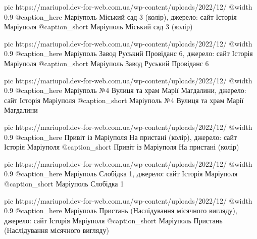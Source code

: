   pic https://mariupol.dev-for-web.com.ua/wp-content/uploads/2022/12/%
  @width 0.9
  @caption_here Маріуполь Міський сад 3 (колір), джерело: сайт Історія Маріуполя
  @caption_short Маріуполь Міський сад 3 (колір)

  pic https://mariupol.dev-for-web.com.ua/wp-content/uploads/2022/12/%
  @width 0.9
  @caption_here Маріуполь Завод Руський Провіданс 6, джерело: сайт Історія Маріуполя
  @caption_short Маріуполь Завод Руський Провіданс 6

  pic https://mariupol.dev-for-web.com.ua/wp-content/uploads/2022/12/%
  @width 0.9
  @caption_here Маріуполь №4 Вулиця та храм Марії Магдалини, джерело: сайт Історія Маріуполя
  @caption_short Маріуполь №4 Вулиця та храм Марії Магдалини

  pic https://mariupol.dev-for-web.com.ua/wp-content/uploads/2022/12/%
  @width 0.9
  @caption_here Привіт із Маріуполя На пристані (колір), джерело: сайт Історія Маріуполя
  @caption_short Привіт із Маріуполя На пристані (колір)

  pic https://mariupol.dev-for-web.com.ua/wp-content/uploads/2022/12/%
  @width 0.9
  @caption_here Маріуполь Слобідка 1, джерело: сайт Історія Маріуполя
  @caption_short Маріуполь Слобідка 1

  pic https://mariupol.dev-for-web.com.ua/wp-content/uploads/2022/12/%
  @width 0.9
  @caption_here Маріуполь Пристань (Наслідування місячного вигляду), джерело: сайт Історія Маріуполя
  @caption_short Маріуполь Пристань (Наслідування місячного вигляду)

